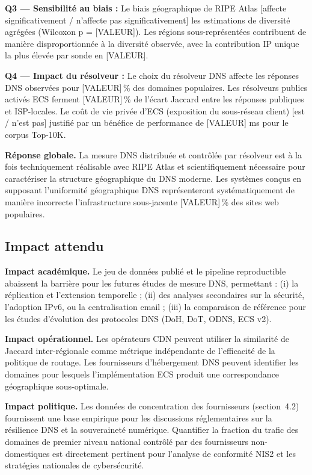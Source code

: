 \textbf{Q3 --- Sensibilité au biais :} Le biais géographique de RIPE Atlas [affecte significativement / n'affecte pas significativement] les estimations de diversité agrégées (Wilcoxon p = [VALEUR]). Les régions sous-représentées contribuent de manière disproportionnée à la diversité observée, avec la contribution IP unique la plus élevée par sonde en [VALEUR].

\textbf{Q4 --- Impact du résolveur :} Le choix du résolveur DNS affecte les réponses DNS observées pour [VALEUR]\,\% des domaines populaires. Les résolveurs publics activés ECS ferment [VALEUR]\,\% de l'écart Jaccard entre les réponses publiques et ISP-locales. Le coût de vie privée d'ECS (exposition du sous-réseau client) [est / n'est pas] justifié par un bénéfice de performance de [VALEUR] ms pour le corpus Top-10K.

\textbf{Réponse globale.} La mesure DNS distribuée et contrôlée par résolveur est à la fois techniquement réalisable avec RIPE Atlas et scientifiquement nécessaire pour caractériser la structure géographique du DNS moderne. Les systèmes conçus en supposant l'uniformité géographique DNS représenteront systématiquement de manière incorrecte l'infrastructure sous-jacente [VALEUR]\,\% des sites web populaires.
\bigskip
\subsection{Impact attendu}
\label{subsec:5.5.3}

\textbf{Impact académique.}
Le jeu de données publié et le pipeline reproductible abaissent la barrière pour les futures études de mesure DNS, permettant : (i) la réplication et l'extension temporelle ; (ii) des analyses secondaires sur la sécurité, l'adoption IPv6, ou la centralisation email ; (iii) la comparaison de référence pour les études d'évolution des protocoles DNS (DoH, DoT, ODNS, ECS v2).

\textbf{Impact opérationnel.}
Les opérateurs CDN peuvent utiliser la similarité de Jaccard inter-régionale comme métrique indépendante de l'efficacité de la politique de routage. Les fournisseurs d'hébergement DNS peuvent identifier les domaines pour lesquels l'implémentation ECS produit une correspondance géographique sous-optimale.

\textbf{Impact politique.}
Les données de concentration des fournisseurs (section~4.2) fournissent une base empirique pour les discussions réglementaires sur la résilience DNS et la souveraineté numérique. Quantifier la fraction du trafic des domaines de premier niveau national contrôlé par des fournisseurs non-domestiques est directement pertinent pour l'analyse de conformité NIS2 et les stratégies nationales de cybersécurité.
\bigskip
